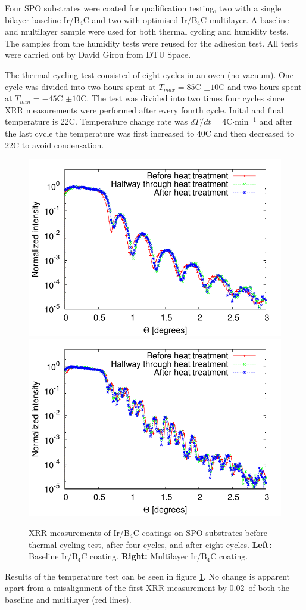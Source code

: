 Four SPO substrates were coated for qualification testing, two with a single bilayer baseline Ir/B$_4$C and two with optimised Ir/B$_4$C multilayer. A baseline and multilayer sample were used for both thermal cycling and humidity tests. The samples from the humidity tests were reused for the adhesion test. All tests were carried out by David Girou from DTU Space.

The thermal cycling test consisted of eight cycles in an oven (no vacuum). One cycle was divided into two hours spent at $T_{max}=85$\degr C $\pm 10$\degr C and two hours spent at $T_{min}=-45$\degr C $\pm 10$\degr C. The test was divided into two times four cycles since XRR measurements were performed after every fourth cycle. Inital and final temperature is 22\degr C. Temperature change rate was ${dT}/{dt}=4$\degr C$\cdot$min$^{-1}$ and after the last cycle the temperature was first increased to 40\degr C and then decreased to 22\degr C to avoid condensation.

\begin{figure}[!h]
  \center
  \includegraphics[width=0.47\linewidth]{figures/athena/coating_on_spo/123-10-12_cooked_2.pdf}
  \includegraphics[width=0.47\linewidth]{figures/athena/coating_on_spo/120-10-21_cooked_2.pdf}
\caption{\footnotesize XRR measurements of Ir/B$_4$C coatings on SPO substrates before thermal cycling test, after four cycles, and after eight cycles. \textbf{Left:} Baseline Ir/B$_4$C coating. \textbf{Right:} Multilayer Ir/B$_4$C coating.}\label{fig:qa_temp}
\end{figure}

Results of the temperature test can be seen in figure \ref{fig:qa_temp}. No change is apparent apart from a misalignment of the first XRR measurement by 0.02\degr\ of both the baseline and multilayer (red lines).

